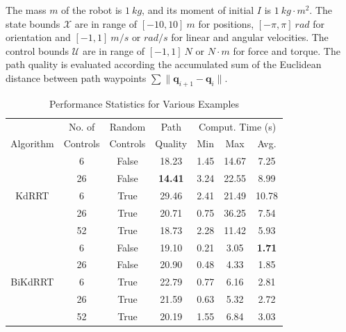 \documentclass[11pt, conference]{IEEEtran}
\begin{document}
The mass $m$ of the robot is $1\ kg$, and its moment of initial $I$ is $1\ kg\cdot m^2$.
The state bounds $\mathcal{X}$ are in range of $[-10, 10]\ m$ for positions, $[-\pi, \pi]\ rad$ for orientation and $[-1, 1]\ m/s \text{ or } rad/s$ for linear and angular velocities.
The control bounds $\mathcal{U}$ are in range of $[-1, 1]\ N \text{ or } N\cdot m$ for force and torque.
The path quality is evaluated according the accumulated sum of the Euclidean distance between path waypoints $\sum \|\mathbf{q}_{i+1} - \mathbf{q}_i\|$.




\begin{table}[htb]
    \centering
    \caption{Performance Statistics for Various Examples}
    \label{tab:result}
    \begin{tabular}{@{}ccccccc@{}}
    \toprule
                             & No. of   & Random   & Path    & \multicolumn{3}{c}{Comput. Time (s)} \\ \cmidrule(l){5-7} 
    Algorithm                & Controls & Controls & Quality & Min        & Max        & Avg.       \\ \midrule
    \multirow{5}{*}{KdRRT}   & 6        & False    & 18.23    & 1.45        & 14.67        & 7.25        \\
                             & 26       & False    & \textbf{14.41}    & 3.24        & 22.55        & 8.99        \\
                             & 6        & True     & 29.46    & 2.41        & 21.49        & 10.78        \\
                             & 26       & True     & 20.71    & 0.75        & 36.25        & 7.54        \\
                             & 52       & True     & 18.73    & 2.28        & 11.42        & 5.93        \\\cmidrule(l){2-7} 
    \multirow{5}{*}{BiKdRRT} & 6        & False    & 19.10    & 0.21        & 3.05        & \textbf{1.71}        \\
                             & 26       & False    & 20.90    & 0.48        & 4.33        & 1.85        \\
                             & 6        & True     & 22.79    & 0.77        & 6.16        & 2.81        \\
                             & 26       & True     & 21.59    & 0.63        & 5.32        & 2.72        \\
                             & 52       & True     & 20.19    & 1.55        & 6.84        & 3.03        \\ \bottomrule
    \end{tabular}
\end{table}
\end{document}
